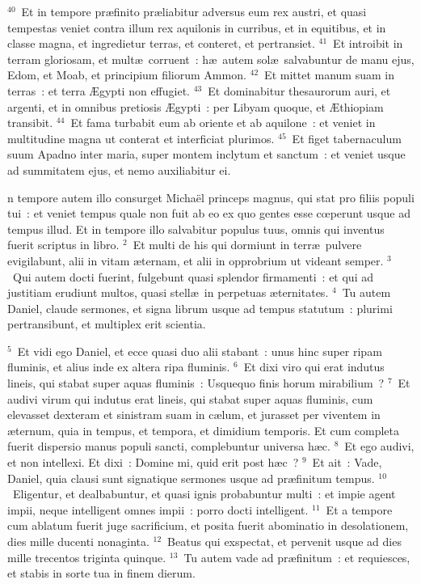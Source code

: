 ${}^{40}$~Et in tempore pr\ae finito pr\ae liabitur adversus eum rex austri, et quasi tempestas veniet contra illum rex aquilonis in curribus, et in equitibus, et in classe magna, et ingredietur terras, et conteret, et pertransiet.
${}^{41}$~Et introibit in terram gloriosam, et mult\ae\ corruent~: h\ae\ autem sol\ae\ salvabuntur de manu ejus, Edom, et Moab, et principium filiorum Ammon.
${}^{42}$~Et mittet manum suam in terras~: et terra \AE gypti non effugiet.
${}^{43}$~Et dominabitur thesaurorum auri, et argenti, et in omnibus pretiosis \AE gypti~: per Libyam quoque, et \AE thiopiam transibit.
${}^{44}$~Et fama turbabit eum ab oriente et ab aquilone~: et veniet in multitudine magna ut conterat et interficiat plurimos.
${}^{45}$~Et figet tabernaculum suum Apadno inter maria, super montem inclytum et sanctum~: et veniet usque ad summitatem ejus, et nemo auxiliabitur ei.

\bchapter
{}n tempore autem illo consurget Micha\"el princeps magnus, qui stat pro filiis populi tui~: et veniet tempus quale non fuit ab eo ex quo gentes esse cœperunt usque ad tempus illud. Et in tempore illo salvabitur populus tuus, omnis qui inventus fuerit scriptus in libro.
${}^{2}$~Et multi de his qui dormiunt in terr\ae\ pulvere evigilabunt, alii in vitam \ae ternam, et alii in opprobrium ut videant semper.
${}^{3}$~Qui autem docti fuerint, fulgebunt quasi splendor firmamenti~: et qui ad justitiam erudiunt multos, quasi stell\ae\ in perpetuas \ae ternitates.
${}^{4}$~Tu autem Daniel, claude sermones, et signa librum usque ad tempus statutum~: plurimi pertransibunt, et multiplex erit scientia.


${}^{5}$~Et vidi ego Daniel, et ecce quasi duo alii stabant~: unus hinc super ripam fluminis, et alius inde ex altera ripa fluminis.
${}^{6}$~Et dixi viro qui erat indutus lineis, qui stabat super aquas fluminis~: Usquequo finis horum mirabilium~?
${}^{7}$~Et audivi virum qui indutus erat lineis, qui stabat super aquas fluminis, cum elevasset dexteram et sinistram suam in c\ae lum, et jurasset per viventem in \ae ternum, quia in tempus, et tempora, et dimidium temporis. Et cum completa fuerit dispersio manus populi sancti, complebuntur universa h\ae c.
${}^{8}$~Et ego audivi, et non intellexi. Et dixi~: Domine mi, quid erit post h\ae c~?
${}^{9}$~Et ait~: Vade, Daniel, quia clausi sunt signatique sermones usque ad pr\ae finitum tempus.
${}^{10}$~Eligentur, et dealbabuntur, et quasi ignis probabuntur multi~: et impie agent impii, neque intelligent omnes impii~: porro docti intelligent.
${}^{11}$~Et a tempore cum ablatum fuerit juge sacrificium, et posita fuerit abominatio in desolationem, dies mille ducenti nonaginta.
${}^{12}$~Beatus qui exspectat, et pervenit usque ad dies mille trecentos triginta quinque.
${}^{13}$~Tu autem vade ad pr\ae finitum~: et requiesces, et stabis in sorte tua in finem dierum.

